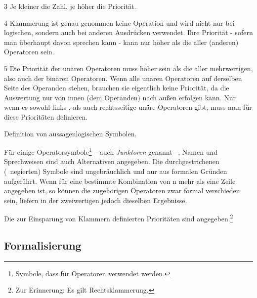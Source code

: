 \begin{table}
\begin{threeparttable}
\begin{tablenotes}
			\item[3] Je kleiner die Zahl, je höher die Priorität.
			\item[4] Klammerung ist genau genommen keine Operation und wird nicht nur bei logischen, sondern auch bei anderen Ausdrücken verwendet. Ihre Priorität - sofern man überhaupt davon sprechen kann - kann nur höher als die aller (anderen) Operatoren sein.
			\item[5] Die Priorität der unären Operatoren muss höher sein als die aller mehrwertigen, also auch der binären Operatoren.
			Wenn alle unären Operatoren auf derselben Seite des Operanden stehen, brauchen sie eigentlich keine Priorität, da die Auswertung nur von innen (dem Operanden) nach außen erfolgen kann.
			Nur wenn es sowohl links-, als auch rechtsseitige unäre Operatoren gibt, muss man für diese Prioritäten definieren.
		\end{tablenotes}
	\end{threeparttable}
	\caption{Definition von aussagenlogischen Symbolen.}
	\label{tab:Symbole}%
\end{table}

Für einige Operatorsymbole\footnote{%
	Symbole, dass für Operatoren verwendet werden.%
}
-- auch \emph{Junktoren} genannt --,
Namen und Sprechweisen sind auch Alternativen angegeben.
Die durchgestrichenen (\textdh\ negierten) Symbole sind ungebräuchlich und nur aus formalen Gründen aufgeführt.
Wenn für eine bestimmte Kombination von n mehr als eine Zeile angegeben ist, so können die zugehörigen Operatoren zwar formal verschieden sein, liefern in der zweiwertigen  jedoch dieselben Ergebnisse.

Die zur Einsparung von Klammern definierten Prioritäten sind  angegeben.\footnote{Zur Erinnerung: Es gilt Rechtsklammerung. }

\subsection{Formalisierung}%
\label{sub:Formalisierung}

